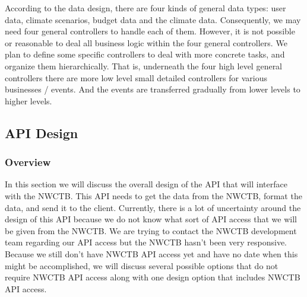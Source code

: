\documentclass[onecolumn, draftclsnofoot,10pt, compsoc]{article}
\begin{document}
	According to the data design, there are four kinds of general data types: user data, climate scenarios, budget data and the climate data. Consequently, we may need four general controllers to handle each of them. However, it is not possible or reasonable to deal all business logic within the four general controllers. We plan to define some specific controllers to deal with more concrete tasks, and organize them hierarchically. That is, underneath the four high level general controllers there are more low level small detailed controllers for various businesses / events. And the events are transferred gradually from lower levels to higher levels.


	\subsection{API Design}
		\subsubsection{Overview}
			In this section we will discuss the overall design of the API that will interface with the NWCTB. This API needs to get the data from the NWCTB, format the data, and send it to the client. Currently, there is a lot of uncertainty around the design of this API because we do not know what sort of API access that we will be given from the NWCTB. We are trying to contact the NWCTB development team regarding our API access but the NWCTB hasn't been very responsive. Because we still don't have NWCTB API access yet and have no date when this might be accomplished, we will discuss several possible options that do not require NWCTB API access along with one design option that includes NWCTB API access.\\
\end{document}
